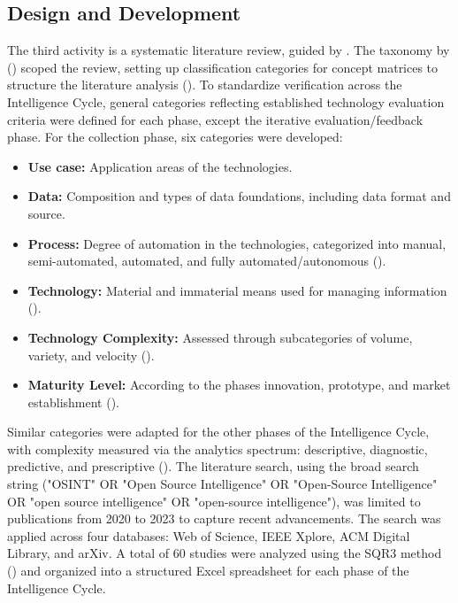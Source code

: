 \documentclass[10pt]{article}
\begin{document}
\subsection{Design and Development}
The third activity is a systematic literature review, guided by \textcite{Cleven.2009}.  The taxonomy by (\cite{Cooper.1988}) scoped the review, setting up classification categories for concept matrices to structure the literature analysis (\cite{Webster.2002}).
To standardize verification across the Intelligence Cycle, general categories reflecting established technology evaluation criteria were defined for each phase, except the iterative evaluation/feedback phase. For the collection phase, six categories were developed:
\begin{itemize}
    \item \textbf{Use case:} Application areas of the technologies.
    \item \textbf{Data:} Composition and types of data foundations, including data format and source.
    \item \textbf{Process:} Degree of automation in the technologies, categorized into manual, semi-automated, automated, and fully automated/autonomous (\cite{Duncheon.2002, Billings.1997, Endsley.1999}).
    \item \textbf{Technology:} Material and immaterial means used for managing information (\cite{Bleck.2004}).
    \item \textbf{Technology Complexity:} Assessed through subcategories of volume, variety, and velocity (\cite{Elgendy.2014, Singh.2012}).
    \item \textbf{Maturity Level:} According to the phases innovation, prototype, and  market establishment (\cite{Stich.2022}).
\end{itemize}

Similar categories were adapted for the other phases of the Intelligence Cycle, with complexity measured via the analytics spectrum: descriptive, diagnostic, predictive, and prescriptive (\cite{Delen.2013}).
The literature search, using the broad search string ("OSINT" OR "Open Source Intelligence" OR "Open-Source Intelligence" OR "open source intelligence" OR "open-source intelligence"), was limited to publications from 2020 to 2023 to capture recent advancements. The search was applied across four databases: Web of Science, IEEE Xplore, ACM Digital Library, and arXiv. A total of 60 studies were analyzed using the SQR3 method (\cite{Robinson.1970}) and organized into a structured Excel spreadsheet for each phase of the Intelligence Cycle.
\end{document}
